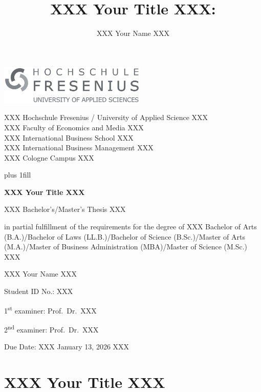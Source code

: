 \documentclass[
  stu,
  floatsintext,
  longtable,
  a4paper,
  nolmodern,
  notxfonts,
  notimes,
  colorlinks=true,linkcolor=black,citecolor=black,urlcolor=black]{apa7}
\title{XXX Your Title XXX:}
\author{XXX Your Name XXX}
\affiliation{
{Cologne, }}
\renewcommand*\contentsname{Table of contents}
\newcommand\contentsname{Table of contents}
\begin{document}
    \cleardoublepage
\thispagestyle{empty}
\hfill \includegraphics[width=7cm]{logo.png}\\
{\centering
  {XXX Hochschule Fresenius / University of Applied Science XXX\\
XXX Faculty of Economics and Media XXX\\
XXX International Business School XXX\\
XXX International Business Management XXX\\
 XXX Cologne Campus XXX  \par
}
  \hbox{}\vskip 0cm plus 1fill
  {\Large \bfseries XXX Your Title XXX \par}
    \vspace{8ex}
  {XXX Bachelor's/Master's Thesis XXX \par}
    {in partial fulfillment of the requirements for the degree of XXX
Bachelor of Arts (B.A.)/Bachelor of Laws (LL.B.)/Bachelor of Science
(B.Sc.)/Master of Arts (M.A.)/Master of Business Administration
(MBA)/Master of Science (M.Sc.) XXX \par}
      \vfill
      {XXX Your Name XXX \par}
      \vspace{0ex}
  { \par}
  \vspace{0ex}
    {\large  \par}
  \vspace{0ex}
  { \par}
    \vspace{0ex}
    {\large  \par}
  \vspace{0ex}
  { \par}
    {Student ID No.: XXX \par}
      \vspace{8ex}
  {1\textsuperscript{st} examiner: Prof.~Dr.~XXX \par}
  {2\textsuperscript{nd} examiner: Prof.~Dr.~XXX \par}
    \vfill
    {Due Date: XXX January 13, 2026 XXX \par}
  \clearpage
}



\renewcommand{\contentsname}{Table of Contents}

\section[Introduction]{XXX Your Title XXX}
\end{document}
